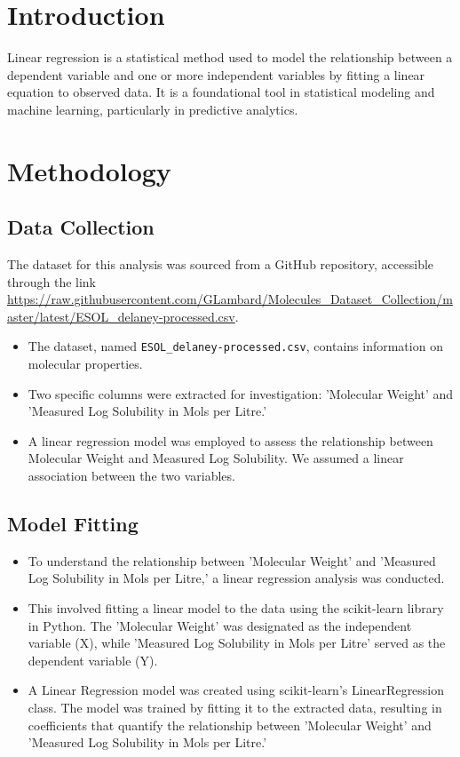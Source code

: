 \documentclass{article}
\begin{document}
\section*{Introduction}

Linear regression is a statistical method used to model the relationship between a dependent variable and one or more independent variables by fitting a linear equation to observed data. It is a foundational tool in statistical modeling and machine learning, particularly in predictive analytics.

\section*{Methodology}

\subsection*{Data Collection}

The dataset for this analysis was sourced from a GitHub repository, accessible through the link \url{https://raw.githubusercontent.com/GLambard/Molecules_Dataset_Collection/master/latest/ESOL_delaney-processed.csv}.

\begin{itemize}
    \item The dataset, named \texttt{ESOL\_delaney-processed.csv}, contains information on molecular properties.
    \item Two specific columns were extracted for investigation: 'Molecular Weight' and 'Measured Log Solubility in Mols per Litre.'
    \item A linear regression model was employed to assess the relationship between Molecular Weight and Measured Log Solubility. We assumed a linear association between the two variables.
\end{itemize}

\subsection*{Model Fitting}

\begin{itemize}
    \item To understand the relationship between 'Molecular Weight' and 'Measured Log Solubility in Mols per Litre,' a linear regression analysis was conducted.
    \item This involved fitting a linear model to the data using the scikit-learn library in Python. The 'Molecular Weight' was designated as the independent variable (X), while 'Measured Log Solubility in Mols per Litre' served as the dependent variable (Y).
    \item A Linear Regression model was created using scikit-learn's LinearRegression class. The model was trained by fitting it to the extracted data, resulting in coefficients that quantify the relationship between 'Molecular Weight' and 'Measured Log Solubility in Mols per Litre.'
\end{itemize}
\end{document}
